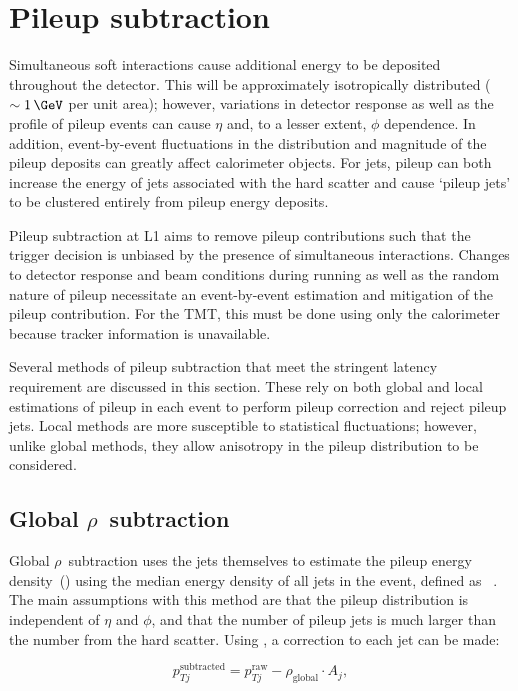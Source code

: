\section{Pileup subtraction}
\label{sec:pileup_algo}
Simultaneous soft interactions cause additional energy to be deposited throughout
the detector. This will be approximately isotropically distributed ($\sim1\,\GeV$ per unit area); however, variations
in detector response as well as the profile of pileup events can cause $\eta$ and,
to a lesser extent, $\phi$ dependence. In addition, event-by-event fluctuations in the distribution 
and magnitude of the pileup deposits can greatly affect calorimeter objects. 
For jets, pileup can both increase the energy of jets associated with the hard 
scatter and cause `pileup jets' to be clustered 
entirely from pileup energy deposits.

Pileup subtraction at L1 aims to remove pileup contributions such that the trigger
decision is unbiased by the presence of simultaneous interactions. Changes to detector response and beam conditions during running
as well as the random nature of pileup necessitate an event-by-event
estimation and mitigation of the pileup contribution. For the TMT, this must be done using only the calorimeter because
tracker information is unavailable. 

Several methods of pileup subtraction that meet the stringent latency requirement
are discussed in this section. These rely on both global and local estimations of 
pileup in each event to perform pileup correction and reject pileup jets. 
Local methods are more susceptible to statistical fluctuations; however,
unlike global methods, they allow anisotropy in the 
pileup distribution to be considered.

\subsection{Global $\rho$~subtraction}

Global $\rho$~subtraction uses the jets themselves to estimate the pileup energy density~(\rhoP) using
the median energy density of all jets in the event, defined as \rhoG~\cite{jet_area}. 
The main assumptions with this method are that the pileup distribution is independent of $\eta$ and $\phi$,  
and that the number of pileup jets is much larger than the number from the hard scatter. Using \rhoG, 
a correction to each jet can be made:

\begin{equation}
\label{equ:global_rho}
p_{Tj}^{\text{subtracted}} = p_{Tj}^{\text{raw}} - \rho_{\text{global}} \cdot A_j,
\end{equation}


